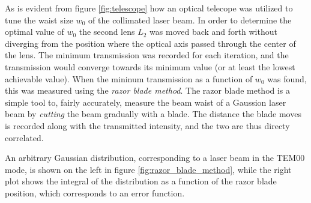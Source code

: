 As is evident from figure \ref{fig:telescope} how an optical telecope was utilized to tune the waist size $w_0$ of the collimated laser beam. In order to determine the optimal value of $w_0$ the second lens $L_2$ was moved back and forth without diverging from the position where the optical axis passed through the center of the lens. The minimum transmission was recorded for each iteration, and the transmission would converge towards its minimum value (or at least the lowest achievable value). When the mininum transmission as a function of $w_0$ was found, this was measured using the \emph{razor blade method}. The razor blade method is a simple tool to, fairly accurately, measure the beam waist of a Gaussion laser beam by \emph{cutting} the beam gradually with a blade. The distance the blade moves is recorded along with the transmitted intensity, and the two are thus directy correlated\cite{Forster}.

An arbitrary Gaussian distribution, corresponding to a laser beam in the TEM00 mode, is shown on the left in figure \ref{fig:razor_blade_method}, while the right plot shows the integral of the distribution as a function of the razor blade position, which corresponds to an error function. 

